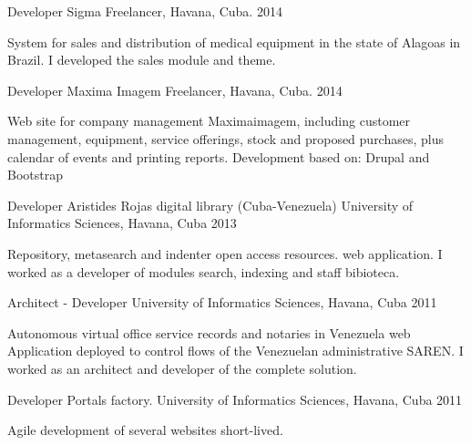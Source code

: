 \begin{cventries}

\cventry
{Developer} %
{Sigma} %
{Freelancer, Havana, Cuba.} %
{2014} %
{ %
\begin{cvitems}
\item {System for sales and distribution of medical equipment in the state of Alagoas in Brazil. I developed the sales module and theme.}
\end{cvitems}
}


\cventry
{Developer} %
{Maxima Imagem} %
{Freelancer, Havana, Cuba.} %
{2014} %
{ %
\begin{cvitems}
\item {Web site for company management Maximaimagem, including customer management, equipment, service offerings, stock and proposed purchases, plus calendar of events and printing reports. Development based on: Drupal and Bootstrap}
\end{cvitems}
}


\cventry
{Developer} %
{Aristides Rojas digital library (Cuba-Venezuela)} %
{University of Informatics Sciences, Havana, Cuba} %
{2013} %
{ %
\begin{cvitems}
\item {Repository, metasearch and indenter open access resources. web application. I worked as a developer of modules search, indexing and staff bibioteca.}
\end{cvitems}
}


\cventry
{Architect - Developer} %
{} %
{University of Informatics Sciences, Havana, Cuba} %
{2011} %
{ %
\begin{cvitems}
\item {Autonomous virtual office service records and notaries in Venezuela web Application deployed to control flows of the Venezuelan administrative SAREN. I worked as an architect and developer of the complete solution.}
\end{cvitems}
}


\cventry
{Developer} %
{Portals factory.} %
{University of Informatics Sciences, Havana, Cuba} %
{2011} %
{ %
\begin{cvitems}
\item {Agile development of several websites short-lived.}
\end{cvitems}
}


\end{cventries}

